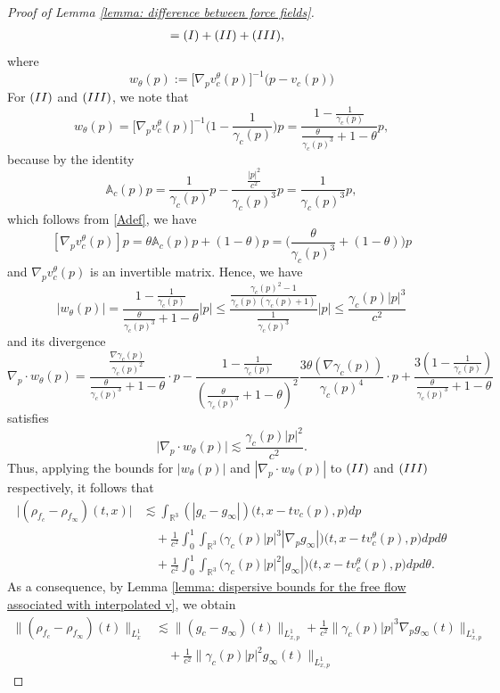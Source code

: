 \documentclass[10pt,a4paper]{amsart}
\begin{document}
\begin{proof}[Proof of Lemma \ref{lemma: difference between force fields}]
$$\begin{aligned}
&=\textup{(I)}+\textup{(II)}+\textup{(III)},
\end{aligned}$$
where 
$$w_\theta(p):=\Big[\nabla_p v_c^\theta(p)\Big]^{-1}\big(p-v_c(p)\big)$$
For $\textup{(II)}$ and $\textup{(III)}$, we note that  
$$w_\theta(p)=\Big[\nabla_p v_c^\theta(p)\Big]^{-1}\bigg(1-\frac{1}{\gamma_c(p)}\bigg)p=\frac{1-\frac{1}{\gamma_c(p)}}{\frac{\theta}{\gamma_c(p)^3}+1-\theta}p,$$
because by the identity 
$$\mathbb{A}_c(p)p=\frac{1}{\gamma_c(p)}p-\frac{\frac{|p|^2}{c^2}}{\gamma_c(p)^3}p=\frac{1}{\gamma_c(p)^3}p,$$
which follows from \eqref{Adef}, we have
$$[\nabla_p v_c^\theta(p)]p=\theta \mathbb{A}_c(p)p+(1-\theta)p=\bigg(\frac{\theta}{\gamma_c(p)^3}+(1-\theta)\bigg)p$$
and $\nabla_p v_c^\theta(p)$ is an invertible matrix. Hence, we have 
$$|w_\theta(p)|=\frac{1-\frac{1}{\gamma_c(p)}}{\frac{\theta}{\gamma_c(p)^3}+1-\theta}|p|\leq\frac{\frac{\gamma_c(p)^2-1}{\gamma_c(p)(\gamma_c(p)+1)}}{\frac{1}{\gamma_c(p)^3}}|p|\leq\frac{\gamma_c(p)|p|^3}{c^2}$$
and its divergence 
$$\nabla_p\cdot w_\theta(p)=\frac{\frac{\nabla\gamma_c(p)}{\gamma_c(p)^2}}{\frac{\theta}{\gamma_c(p)^3}+1-\theta}\cdot p-\frac{1-\frac{1}{\gamma_c(p)}}{(\frac{\theta}{\gamma_c(p)^3}+1-\theta)^2}\frac{3\theta(\nabla\gamma_c(p))}{\gamma_c(p)^4}\cdot p+\frac{3(1-\frac{1}{\gamma_c(p)})}{\frac{\theta}{\gamma_c(p)^3}+1-\theta}$$
satisfies
$$\big|\nabla_p\cdot w_\theta(p)\big|\lesssim\frac{\gamma_c(p)|p|^2}{c^2}.$$
Thus, applying the bounds for $|w_\theta(p)|$ and $|\nabla_p\cdot w_\theta(p)|$ to $\textup{(II)}$ and $\textup{(III)}$ respectively, it follows that 
$$\begin{aligned}
\big|(\rho_{f_c}-\rho_{f_\infty})(t,x)\big|&\lesssim\int_{\mathbb{R}^3}(|g_c-g_\infty|)\Big(t,x-tv_c(p),p\Big)dp\\
&\quad+\frac{1}{c^2}\int_0^1\int_{\mathbb{R}^3}\Big(\gamma_c(p)|p|^3|\nabla_pg_\infty|\Big)\Big(t,x-tv_c^\theta(p),p\Big)dpd\theta\\
&\quad+\frac{1}{c^2}\int_0^1\int_{\mathbb{R}^3}\Big(\gamma_c(p)|p|^2|g_\infty|\Big)\Big(t,x-tv_c^\theta(p),p\Big)dpd\theta.
\end{aligned}$$
As a consequence, by Lemma \ref{lemma: dispersive bounds for the free flow associated with interpolated v}, we obtain 
$$\begin{aligned}
\big\|(\rho_{f_c}-\rho_{f_\infty})(t)\big\|_{L_x^1}&\lesssim\|(g_c-g_\infty)(t)\|_{L_{x,p}^1}+\frac{1}{c^2}\big\|\gamma_c(p)|p|^3\nabla_pg_\infty(t)\big\|_{L_{x,p}^1}\\
&\quad+\frac{1}{c^2}\big\|\gamma_c(p)|p|^2g_\infty(t)\big\|_{L_{x,p}^1}
\end{aligned}$$

\end{proof}
\end{document}
